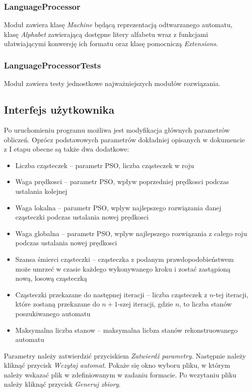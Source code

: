 \documentclass{../llncs_template_final/llncs}
\begin{document}
\subsubsection*{LanguageProcessor}
Moduł zawiera klasę \emph{Machine} będącą reprezentacją odtwarzanego automatu, klasę \emph{Alphabet} zawierającą dostępne litery alfabetu wraz z funkcjami ułatwiającymi konwersję ich formatu oraz klasę pomocniczą \emph{Extensions}.

\subsubsection*{LanguageProcessorTests}
Moduł zawiera testy jednostkowe najważniejszych modułów rozwiązania.

\subsection{Interfejs użytkownika}
Po uruchomieniu programu możliwa jest modyfikacja głównych parametrów obliczeń. Oprócz podstawowych parametrów dokładniej opisanych w dokumencie z I etapu obecne są także dwa dodatkowe:

\begin{itemize}
\item Liczba cząsteczek -- parametr PSO, liczba cząsteczek w roju
\item Waga prędkosci -- parametr PSO, wpływ poprzedniej prędkosci podczas ustalania kolejnej
\item Waga lokalna -- parametr PSO, wplyw najlepszego rozwiązania danej cząsteczki podczas ustalania nowej prędkosci
\item Waga globalna -- parametr PSO, wplyw najlepszego rozwiązania z całego roju podczas ustalania nowej prędkosci
\item Szansa śmierci cząsteczki -- cząsteczka z podanym prawdopodobieństwem może umrzeć w czasie każdego wykonywanego kroku i zostać zastąpioną nową, losową cząsteczką
\item Cząsteczki przekazane do następnej iteracji -- liczba cząsteczek z $n$-tej iteracji, które zostaną przekazane do $n+1$-szej iteracji, gdzie $n$, to liczba stanów poszukiwanego automatu
\item Maksymalna liczba stanow -- maksymalna licbza stanów rekonstruowanego automatu
\end{itemize}

Parametry należy zatwierdzić przyciskiem \emph{Zatwierdź parametry}. Następnie należy kliknąć przycisk \emph{Wczytaj automat}. Pokaże się okno wyboru pliku, w którym należy wskazać plik w zdefiniowanym w zadaniu formacie. Po wczytaniu pliku należy kliknąć przycisk \emph{Generuj zbiory}.
\end{document}
